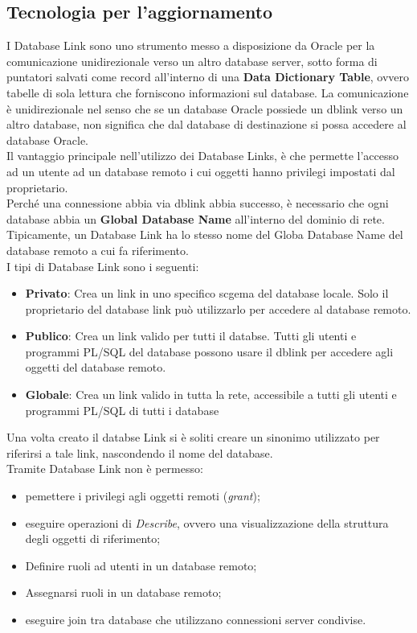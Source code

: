 \subsection{Tecnologia per l'aggiornamento}
I Database Link sono uno strumento messo a disposizione da Oracle per la comunicazione unidirezionale verso un altro database server, sotto forma di puntatori salvati come record all'interno di una \textbf{Data Dictionary Table}, ovvero tabelle di sola lettura che forniscono informazioni sul database. La comunicazione è unidirezionale nel senso che se un database Oracle possiede un dblink verso un altro database, non significa che dal database di destinazione si possa accedere al database Oracle.\\
Il vantaggio principale nell'utilizzo dei Database Links, è che permette l'accesso ad un utente ad un database remoto i cui oggetti hanno privilegi impostati dal proprietario.\\
Perché una connessione abbia via dblink abbia successo, è necessario che ogni database abbia un \textbf{Global Database Name} all'interno del dominio di rete. Tipicamente, un Database Link ha lo stesso nome del Globa Database Name del database remoto a cui fa riferimento.\\
I tipi di Database Link sono i seguenti:
\begin{itemize}
\item \textbf{Privato}: Crea un link in uno specifico scgema del database locale. Solo il proprietario del database link può utilizzarlo per accedere al database remoto. 
\item \textbf{Publico}: Crea un link valido per tutti il databse. Tutti gli utenti e programmi PL/SQL del database possono usare il dblink per accedere agli oggetti del database remoto.
\item \textbf{Globale}: Crea un link valido in tutta la rete, accessibile a tutti gli utenti e programmi PL/SQL di tutti i database 
\end{itemize}
Una volta creato il databse Link si è soliti creare un sinonimo utilizzato per riferirsi a tale link, nascondendo il nome del database.\\
Tramite Database Link non è permesso:
\begin{itemize}
\item pemettere i privilegi agli oggetti remoti (\textit{grant});
\item eseguire operazioni di \textit{Describe}, ovvero una visualizzazione della struttura degli oggetti di riferimento;
\item Definire ruoli ad utenti in un database remoto;
\item Assegnarsi ruoli in un database remoto;
\item eseguire join tra database che utilizzano connessioni server condivise.
\end{itemize}
